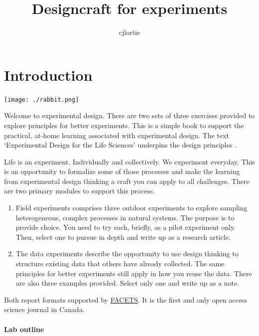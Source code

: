 \documentclass[
]{book}
\title{Designcraft for experiments}
\author{cjlortie}
\date{}
\begin{document}
\maketitle

{
\setcounter{tocdepth}{1}
\tableofcontents
}
\hypertarget{introduction}{%
\chapter{Introduction}\label{introduction}}

\texttt{[image: ./rabbit.png]}

Welcome to experimental design. There are two sets of three exercises provided to explore principles for better experiments. This is a simple book to support the practical, at-home learning associated with experimental design. The text `Experimental Design for the Life Sciences' underpins the design principles \citep{RN6381}.

Life is an experiment. Individually and collectively. We experiment everyday. This is an opportunity to formalize some of those processes and make the learning from experimental design thinking a craft you can apply to all challenges. There are two primary modules to support this process.

\begin{enumerate}
\def\labelenumi{(\arabic{enumi})}
\item
  Field experiments comprises three outdoor experiments to explore sampling heterogeneous, complex processes in natural systems. The purpose is to provide choice. You need to try each, briefly, as a pilot experiment only. Then, select one to pursue in depth and write up as a research article.
\item
  The data experiments describe the opportunity to use design thinking to structure existing data that others have already collected. The same principles for better experiments still apply in how you reuse the data. There are also three examples provided. Select only one and write up as a note.
\end{enumerate}

Both report formats supported by \href{https://www.facetsjournal.com/about/}{FACETS}. It is the first and only open access science journal in Canada.

\hypertarget{lab-outline}{%
\subsubsection*{Lab outline}\label{lab-outline}}
\end{document}
